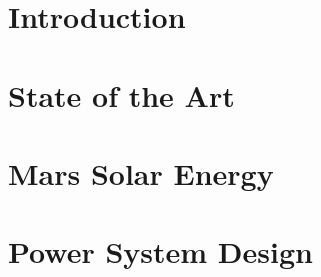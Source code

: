 \documentclass[%
    draft, %
    11pt,
    a4paper
]
{memoir}
\begin{document}

\chapter{Introduction}
\label{sec:Introduction}



\chapter{State of the Art}
\label{sec:StateOfTheArt}



\chapter{Mars Solar Energy}
\label{sec:MarsSolarEnergy}



\chapter{Power System Design}
\label{sec:PowerSystemDesign}


%
\end{document}
